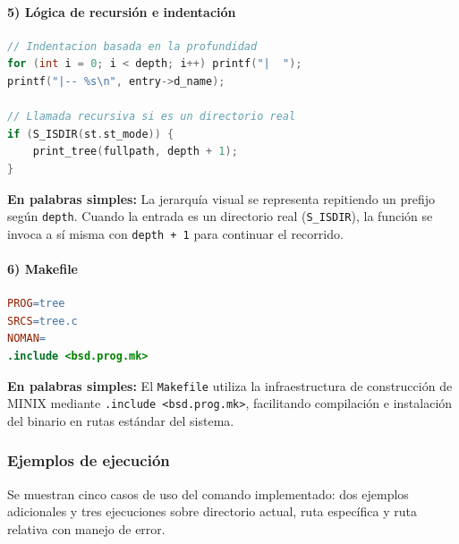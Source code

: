 \documentclass[12pt,spanish]{article}
\begin{document}
\paragraph{5) Lógica de recursión e indentación}
\begin{lstlisting}[language=C, caption={Visualizacion jerarquica y descenso recursivo}]
// Indentacion basada en la profundidad
for (int i = 0; i < depth; i++) printf("|  ");
printf("|-- %s\n", entry->d_name);

// Llamada recursiva si es un directorio real
if (S_ISDIR(st.st_mode)) {
    print_tree(fullpath, depth + 1);
}
\end{lstlisting}
\textbf{En palabras simples:} La jerarquía visual se representa repitiendo un prefijo según \texttt{depth}. Cuando la entrada es un directorio real (\texttt{S\_ISDIR}), la función se invoca a sí misma con \texttt{depth + 1} para continuar el recorrido.

\paragraph{6) Makefile}
\begin{lstlisting}[language=make, caption={Makefile para integracion con MINIX}]
PROG=tree
SRCS=tree.c
NOMAN=
.include <bsd.prog.mk>
\end{lstlisting}
\textbf{En palabras simples:} El \texttt{Makefile} utiliza la infraestructura de construcción de MINIX mediante \texttt{.include <bsd.prog.mk>}, facilitando compilación e instalación del binario en rutas estándar del sistema.

\subsubsection*{Ejemplos de ejecución}

Se muestran cinco casos de uso del comando implementado: dos ejemplos adicionales y tres ejecuciones sobre directorio actual, ruta específica y ruta relativa con manejo de error.

\enlargethispage{2\baselineskip}
\end{document}
